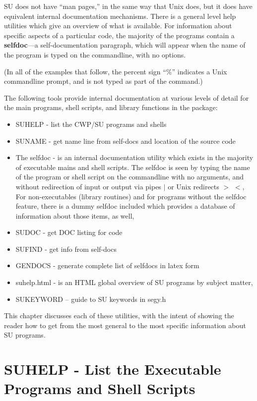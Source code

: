 SU does not have ``man pages,'' in the same way that
Unix does, but it does have equivalent internal documentation
mechanisms.
There is a general level help utilities which give an
overview of what is available.
For information about specific aspects of a particular code,
the majority of the programs contain a {\bf selfdoc}---a
self-documentation paragraph, which will appear when the name
of the program is typed on the commandline, with no options.

(In all of the examples that follow, the percent sign ``\%''
indicates a Unix commandline prompt, and is not typed
as part of the command.)

The following tools provide internal documentation at various
levels of detail for the main programs, shell scripts, and
library functions in the package:

\begin{itemize}
\item SUHELP - list the CWP/SU programs and shells
\item SUNAME - get name line from self-docs and location of the source code
\item The selfdoc - is an internal documentation utility which exists
in the majority of executable mains and shell scripts. The selfdoc
is seen by typing the name of the program or shell script on the commandline
with no arguments, and without redirection of input or output via
pipes $|$ or Unix redirects $>$ $<$,
For non-executables (library routines) and for programs without the
selfdoc feature, there is a dummy selfdoc included which provides a
database of information about those items, as well,
\item SUDOC - get DOC listing for code 
\item SUFIND - get info from self-docs 
\item GENDOCS - generate complete list of selfdocs in latex form 
\item suhelp.html - is an HTML global overview of SU programs by subject
matter,
\item SUKEYWORD -- guide to SU keywords in segy.h 
\end{itemize}

This chapter discusses each of these utilities, with the intent
of showing the reader how to get from the most general to the
most specific information about SU programs.

\section{SUHELP - List the Executable Programs and Shell Scripts} 

